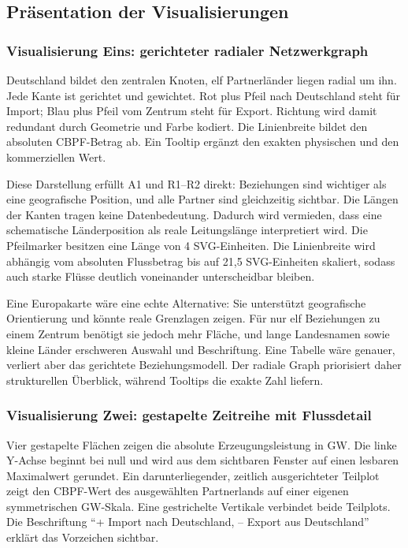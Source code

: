 \subsection{Präsentation der Visualisierungen}
\label{sec:praesentation}

\subsubsection{Visualisierung Eins: gerichteter radialer Netzwerkgraph}
\label{sec:vis1}

Deutschland bildet den zentralen Knoten, elf Partnerländer liegen radial um
ihn. Jede Kante ist gerichtet und gewichtet. Rot plus Pfeil nach Deutschland
steht für Import; Blau plus Pfeil vom Zentrum steht für Export. Richtung wird
damit redundant durch Geometrie und Farbe kodiert. Die Linienbreite bildet den
absoluten CBPF-Betrag ab. Ein Tooltip ergänzt den exakten physischen und den
kommerziellen Wert.

Diese Darstellung erfüllt A1 und R1--R2 direkt: Beziehungen sind wichtiger als
eine geografische Position, und alle Partner sind gleichzeitig sichtbar. Die
Längen der Kanten tragen keine Datenbedeutung. Dadurch wird vermieden, dass
eine schematische Länderposition als reale Leitungslänge interpretiert wird.
Die Pfeilmarker besitzen eine Länge von 4 SVG-Einheiten. Die Linienbreite wird
abhängig vom absoluten Flussbetrag bis auf 21,5 SVG-Einheiten skaliert, sodass
auch starke Flüsse deutlich voneinander unterscheidbar bleiben.

Eine Europakarte wäre eine echte Alternative: Sie unterstützt geografische
Orientierung und könnte reale Grenzlagen zeigen. Für nur elf Beziehungen zu
einem Zentrum benötigt sie jedoch mehr Fläche, und lange Landesnamen sowie
kleine Länder erschweren Auswahl und Beschriftung. Eine Tabelle wäre genauer,
verliert aber das gerichtete Beziehungsmodell. Der radiale Graph priorisiert
daher strukturellen Überblick, während Tooltips die exakte Zahl liefern.

\subsubsection{Visualisierung Zwei: gestapelte Zeitreihe mit Flussdetail}
\label{sec:vis2}

Vier gestapelte Flächen zeigen die absolute Erzeugungsleistung in GW. Die
linke Y-Achse beginnt bei null und wird aus dem sichtbaren Fenster auf einen
lesbaren Maximalwert gerundet. Ein darunterliegender, zeitlich ausgerichteter
Teilplot zeigt den CBPF-Wert des ausgewählten Partnerlands auf einer eigenen
symmetrischen GW-Skala. Eine gestrichelte Vertikale verbindet beide Teilplots.
Die Beschriftung ``+ Import nach Deutschland, -- Export aus Deutschland''
erklärt das Vorzeichen sichtbar.


